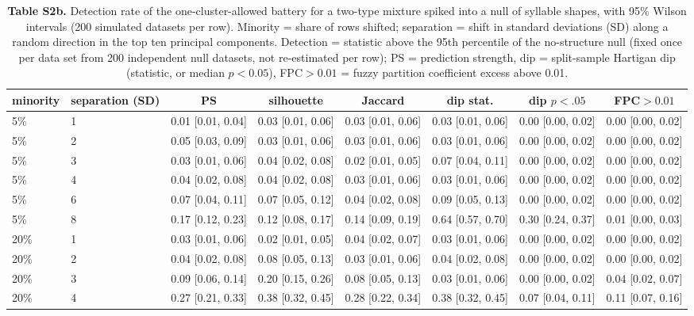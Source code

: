 \begin{table}[htbp]\centering\scriptsize
\caption{\textbf{Table S2b.} Detection rate of the one-cluster-allowed battery for a two-type mixture spiked into a null of syllable shapes, with 95\% Wilson intervals (200 simulated datasets per row). Minority = share of rows shifted; separation = shift in standard deviations (SD) along a random direction in the top ten principal components. Detection = statistic above the 95th percentile of the no-structure null (fixed once per data set from 200 independent null datasets, not re-estimated per row); PS = prediction strength, dip = split-sample Hartigan dip (statistic, or median $p<0.05$), FPC$>0.01$ = fuzzy partition coefficient excess above 0.01.}\label{tab:S2b}
\begin{adjustbox}{max width=\linewidth}
\begin{tabular}{llcccccc}
\toprule
minority & separation (SD) & PS & silhouette & Jaccard & dip stat. & dip $p<.05$ & FPC$>0.01$ \\
\midrule
5\% & 1 & 0.01 [0.01, 0.04] & 0.03 [0.01, 0.06] & 0.03 [0.01, 0.06] & 0.03 [0.01, 0.06] & 0.00 [0.00, 0.02] & 0.00 [0.00, 0.02] \\
5\% & 2 & 0.05 [0.03, 0.09] & 0.03 [0.01, 0.06] & 0.03 [0.01, 0.06] & 0.03 [0.01, 0.06] & 0.00 [0.00, 0.02] & 0.00 [0.00, 0.02] \\
5\% & 3 & 0.03 [0.01, 0.06] & 0.04 [0.02, 0.08] & 0.02 [0.01, 0.05] & 0.07 [0.04, 0.11] & 0.00 [0.00, 0.02] & 0.00 [0.00, 0.02] \\
5\% & 4 & 0.04 [0.02, 0.08] & 0.04 [0.02, 0.08] & 0.03 [0.01, 0.06] & 0.03 [0.01, 0.06] & 0.00 [0.00, 0.02] & 0.00 [0.00, 0.02] \\
5\% & 6 & 0.07 [0.04, 0.11] & 0.07 [0.05, 0.12] & 0.04 [0.02, 0.08] & 0.09 [0.05, 0.13] & 0.00 [0.00, 0.02] & 0.00 [0.00, 0.02] \\
5\% & 8 & 0.17 [0.12, 0.23] & 0.12 [0.08, 0.17] & 0.14 [0.09, 0.19] & 0.64 [0.57, 0.70] & 0.30 [0.24, 0.37] & 0.01 [0.00, 0.03] \\
20\% & 1 & 0.03 [0.01, 0.06] & 0.02 [0.01, 0.05] & 0.04 [0.02, 0.07] & 0.03 [0.01, 0.06] & 0.00 [0.00, 0.02] & 0.00 [0.00, 0.02] \\
20\% & 2 & 0.04 [0.02, 0.08] & 0.08 [0.05, 0.13] & 0.03 [0.01, 0.06] & 0.04 [0.02, 0.08] & 0.00 [0.00, 0.02] & 0.00 [0.00, 0.02] \\
20\% & 3 & 0.09 [0.06, 0.14] & 0.20 [0.15, 0.26] & 0.08 [0.05, 0.13] & 0.03 [0.01, 0.06] & 0.00 [0.00, 0.02] & 0.04 [0.02, 0.07] \\
20\% & 4 & 0.27 [0.21, 0.33] & 0.38 [0.32, 0.45] & 0.28 [0.22, 0.34] & 0.38 [0.32, 0.45] & 0.07 [0.04, 0.11] & 0.11 [0.07, 0.16] \\

\end{tabular}
\end{adjustbox}
\end{table}
